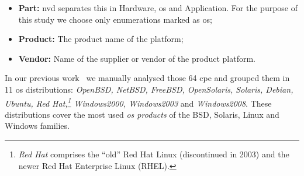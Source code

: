 \begin{itemize}
\item \textbf{Part:} \gls{nvd} separates this in Hardware, \gls{os} and Application. For the purpose of this study we choose only enumerations marked as \gls{os};
\item \textbf{Product:} The product name of the platform;
\item \textbf{Vendor:} Name of the supplier or vendor of the product platform.
\end{itemize}

In our previous work~\cite{Garcia:2012} we manually analysed those 64 \gls{cpe} and grouped them in 11 \gls{os} distributions: \textit{OpenBSD, NetBSD, FreeBSD, OpenSolaris, Solaris, Debian, Ubuntu, Red Hat,\footnote{\textit{Red Hat} comprises the ``old'' Red Hat Linux (discontinued in 2003) and the newer Red Hat Enterprise Linux (RHEL).} Windows2000, Windows2003} and \textit{Windows2008}.
These distributions cover the most used \emph{\gls{os} products} of the BSD, Solaris, Linux and Windows families.







